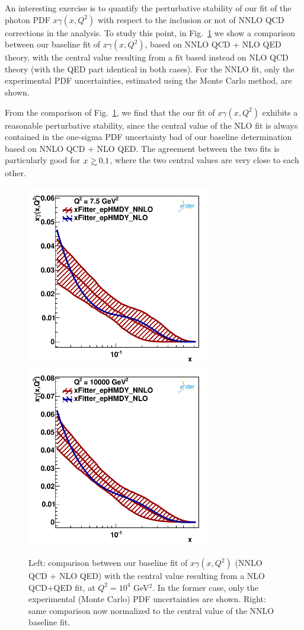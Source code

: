 An interesting exercise
is to quantify the perturbative stability
of our fit of the photon PDF $x\gamma(x,Q^2)$ with respect
to the inclusion or not of NNLO QCD corrections in the analysis.
%
To study this point, in Fig.~\ref{fig:nlo_vs_nnlo} we show
a comparison between our baseline
fit of $x\gamma(x,Q^2)$, based on NNLO QCD + NLO QED theory,
with the central value resulting from a fit based instead on
NLO QCD theory (with the QED part identical in both cases).
%
For the NNLO fit, only the experimental PDF
  uncertainties, estimated using the Monte Carlo method, are shown.

  From the comparison of Fig.~\ref{fig:nlo_vs_nnlo}, we find that
  the our fit of $x\gamma(x,Q^2)$ exhibits a reasonable
  perturbative stability, since the central value of the
  NLO fit is always contained in the one-sigma PDF
  uncertainty bad of our baseline determination based
  on NNLO QCD + NLO QED.
  The agreement between the two fits is particularly good
  for $x\gsim 0.1$, where the two central values are
  very close to each other.

\begin{figure}[t]
\centering
\includegraphics[width=8cm]{figs/q2_7_5_pdf_ph_NLOvsNNLO.pdf}
\includegraphics[width=8cm]{figs/q2_10000_pdf_ph_NLOvsNNLO.pdf}
\caption{Left: comparison between our baseline
  fit of $x\gamma(x,Q^2)$ (NNLO QCD + NLO QED) with the central value
  resulting from a NLO QCD+QED fit, at $Q^2=10^4$ GeV$^2$.
  In the former case, only the experimental (Monte Carlo) PDF
  uncertainties are shown.
  Right: same comparison now normalized to the central value
  of the NNLO baseline fit.
}
\label{fig:nlo_vs_nnlo}
\end{figure}
